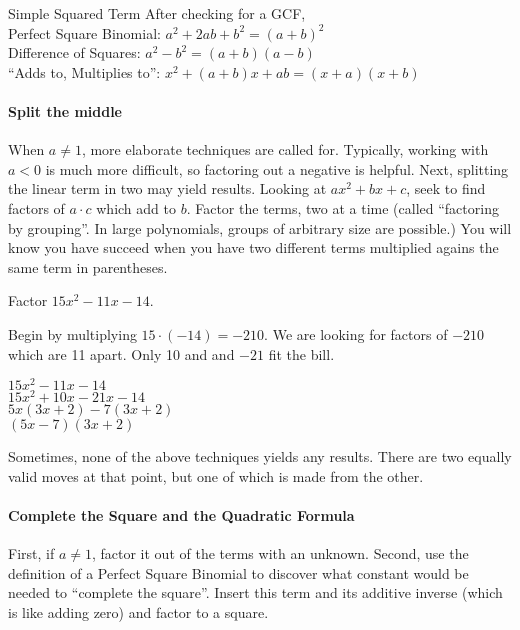 \begin{derivation}{Simple Squared Term}
After checking for a GCF,\\
Perfect Square Binomial: $a^2 + 2ab + b^2 = (a+b)^2$\\
Difference of Squares: $a^2 - b^2 = (a+b)(a-b)$\\
``Adds to, Multiplies to'': $x^2 + (a+b)x + ab = (x + a)(x + b)$\\
\end{derivation}

\paragraph{Split the middle}
When $a\ne1$, more elaborate techniques are called for.  Typically, working with $a<0$ is much
more difficult, so factoring out a negative is helpful.  Next, splitting the linear term in two may
yield results.  Looking at $ax^2+bx+c$, seek to find factors of $a\cdot c$ which add to $b$.  
Factor the terms, two at a time (called ``factoring by grouping''.  In large polynomials, groups of
arbitrary size are possible.)  You will know you have succeed when you have two different
terms multiplied agains the same term in parentheses.

\begin{example}
\exProblem
Factor $15x^2-11x-14$.

\exSolution
Begin by multiplying $15\cdot(-14)=-210$.  We are looking for factors of $-210$ which are 11 apart.
Only 10 and and $-21$ fit the bill.

$15x^2-11x-14$\\
$15x^2+10x-21x-14$\\
$5x(3x+2)-7(3x+2)$\\
$(5x-7)(3x+2)$
\end{example}

Sometimes, none of the above techniques yields any results.  There are two equally valid
moves at that point, but one of which is made from the other.

\paragraph{Complete the Square and the Quadratic Formula}
First, if $a\ne1$, factor it out of the terms with an unknown.  
Second, use the definition of a Perfect Square Binomial
to discover what constant would be needed to ``complete the square''.  Insert this term and its
additive inverse (which is like adding zero) and factor to a square.

